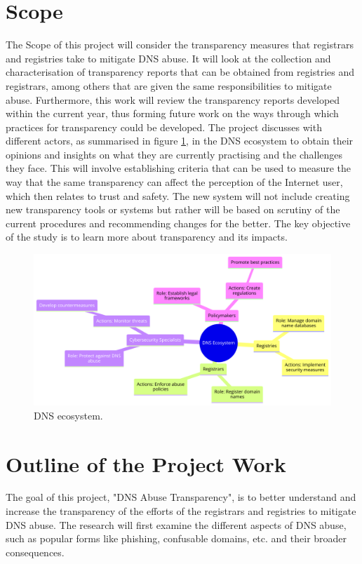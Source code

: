 \section{Scope}	
The Scope of this project will consider the transparency measures that registrars and registries take to mitigate DNS abuse. It will look at the collection and characterisation of transparency reports that can be obtained from registries and registrars, among others that are given the same responsibilities to mitigate abuse. Furthermore, this work will review the transparency reports developed within the current year, thus forming future work on the ways through which practices for transparency could be developed. The project discusses with different actors, as summarised in figure \ref{fig:dnsintrointro}, in the DNS ecosystem to obtain their opinions and insights on what they are currently practising and the challenges they face. This will involve establishing criteria that can be used to measure the way that the same transparency can affect the perception of the Internet user, which then relates to trust and safety. The new system will not include creating new transparency tools or systems but rather will be based on scrutiny of the current procedures and recommending changes for the better. The key objective of the study is to learn more about transparency and its impacts.  

\begin{figure}[H]
    \centering
    \includegraphics[width=0.7\linewidth]{introduction/diagram (8).png}
    \caption{ DNS ecosystem.}
    \label{fig:dnsintrointro}
\end{figure}

\section{ Outline of the Project Work} 

The goal of this project, "DNS Abuse Transparency", is to better understand and increase the transparency of the efforts of the registrars and registries to mitigate DNS abuse. The research will first examine the different aspects of DNS abuse, such as popular forms like phishing, confusable domains, etc. and their broader consequences. 

